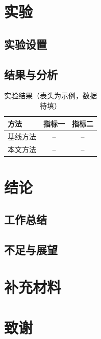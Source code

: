 \documentclass[UTF8,fontset=fandol,a4paper,zihao=-4,oneside,openany]{ctexbook}
\theoremstyle{plain}
\theoremstyle{definition}
\begin{document}
\chapter{实验}
\section{实验设置}
\section{结果与分析}
\begin{table}[htbp]
  \centering
  \caption{实验结果（表头为示例，数据待填）}
  \label{tab:results}
  \begin{tabular}{lcc}
    \toprule
    方法     & 指标一 & 指标二 \\
    \midrule
    基线方法 & --     & --     \\
    本文方法 & --     & --     \\
    \bottomrule
  \end{tabular}
\end{table}

\chapter{结论}
\section{工作总结}
\section{不足与展望}




\appendix
\chapter{补充材料}

\backmatter
\chapter{致谢}
\end{document}

